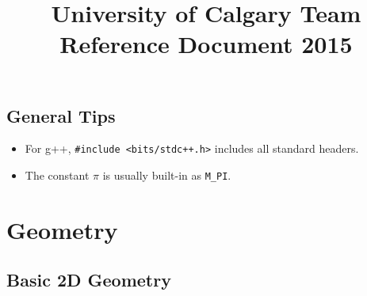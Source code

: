 \documentclass[letterpaper]{article}
\begin{document}
\title{University of Calgary Team Reference Document 2015}
\maketitle
\thispagestyle{myheadings}

\begin{multicols*}{2}

\tableofcontents

\section{General Tips}
\begin{itemize}
\item For g++, \texttt{\#include <bits/stdc++.h>} includes all standard headers.
\item The constant $\pi$ is usually built-in as \texttt{M\_PI}.
\end{itemize}

\end{multicols*}

\section{Geometry}

\subsection{Basic 2D Geometry}
\end{document}
